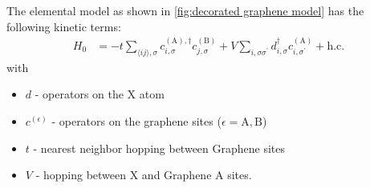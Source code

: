 \documentclass[../notes.tex]{subfiles}
\begin{document}
The elemental model as shown in \cref{fig:decorated graphene model} has the following kinetic terms:
\begin{align}
	H_0 &= -t \sum_{\langle ij \rangle, \sigma}
	c_{i, \sigma}^{(\mathrm{A}), \dagger} c_{j, \sigma}^{(\mathrm{B})}
	+ V \sum_{i, \sigma \sigma^{\prime}}
	d_{i, \sigma}^{\dagger} c_{i, \sigma^{\prime}}^{(\mathrm{A})} + \mathrm{h.c.}
	\label{eq:EG-X model Hamiltonian non-interacting}
\end{align}
with
\begin{itemize}
	\item \(d\) - operators on the X atom
	\item \(c^{(\epsilon)}\) - operators on the graphene sites (\(\epsilon = \mathrm{A}, \mathrm{B}\))
	\item \(t\) - nearest neighbor hopping between Graphene sites
	\item \(V\) - hopping between \(\mathrm{X}\) and Graphene \(\mathrm{A}\) sites.
\end{itemize}
\end{document}
